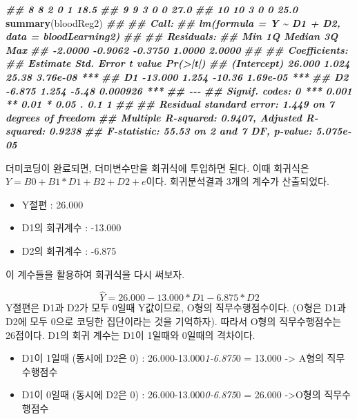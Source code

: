 \documentclass[
]{book}
\newenvironment{Shaded}{\begin{snugshade}}{\end{snugshade}}
\newcommand{\DocumentationTok}[1]{\textcolor[rgb]{0.56,0.35,0.01}{\textbf{\textit{#1}}}}
\newcommand{\FunctionTok}[1]{\textcolor[rgb]{0.13,0.29,0.53}{\textbf{#1}}}
\newcommand{\NormalTok}[1]{#1}
\providecommand{\tightlist}{%
  \setlength{\itemsep}{0pt}\setlength{\parskip}{0pt}}
\begin{document}
\begin{Shaded}
\begin{Highlighting}[]
\DocumentationTok{\#\# 8   8 2  0  1 18.5}
\DocumentationTok{\#\# 9   9 3  0  0 27.0}
\DocumentationTok{\#\# 10 10 3  0  0 25.0}
\FunctionTok{summary}\NormalTok{(bloodReg2)}
\DocumentationTok{\#\# }
\DocumentationTok{\#\# Call:}
\DocumentationTok{\#\# lm(formula = Y \textasciitilde{} D1 + D2, data = bloodLearning2)}
\DocumentationTok{\#\# }
\DocumentationTok{\#\# Residuals:}
\DocumentationTok{\#\#     Min      1Q  Median      3Q     Max }
\DocumentationTok{\#\# {-}2.0000 {-}0.9062 {-}0.3750  1.0000  2.0000 }
\DocumentationTok{\#\# }
\DocumentationTok{\#\# Coefficients:}
\DocumentationTok{\#\#             Estimate Std. Error t value Pr(\textgreater{}|t|)    }
\DocumentationTok{\#\# (Intercept)   26.000      1.024   25.38 3.76e{-}08 ***}
\DocumentationTok{\#\# D1           {-}13.000      1.254  {-}10.36 1.69e{-}05 ***}
\DocumentationTok{\#\# D2            {-}6.875      1.254   {-}5.48 0.000926 ***}
\DocumentationTok{\#\# {-}{-}{-}}
\DocumentationTok{\#\# Signif. codes:  0 \textquotesingle{}***\textquotesingle{} 0.001 \textquotesingle{}**\textquotesingle{} 0.01 \textquotesingle{}*\textquotesingle{} 0.05 \textquotesingle{}.\textquotesingle{} 0.1 \textquotesingle{} \textquotesingle{} 1}
\DocumentationTok{\#\# }
\DocumentationTok{\#\# Residual standard error: 1.449 on 7 degrees of freedom}
\DocumentationTok{\#\# Multiple R{-}squared:  0.9407, Adjusted R{-}squared:  0.9238 }
\DocumentationTok{\#\# F{-}statistic: 55.53 on 2 and 7 DF,  p{-}value: 5.075e{-}05}
\end{Highlighting}
\end{Shaded}

더미코딩이 완료되면, 더미변수만을 회귀식에 투입하면 된다. 이때 회귀식은 \(Y=B0+B1*D1+B2+D2+e\)이다. 회귀분석결과 3개의 계수가 산출되었다.

\begin{itemize}
\tightlist
\item
  Y절편 : 26.000
\item
  D1의 회귀계수 : -13.000
\item
  D2의 회귀계수 : -6.875
\end{itemize}

이 계수들을 활용하여 회귀식을 다시 써보자.

\[ \hat{Y}= 26.000-13.000\ast D1 -6.875\ast D2 \]
Y절편은 D1과 D2가 모두 0일때 Y값이므로, O형의 직무수행점수이다. (O형은 D1과 D2에 모두 0으로 코딩한 집단이라는 것을 기억하자). 따라서 O형의 직무수행점수는 26점이다.
D1의 회귀 계수는 D1이 1일때와 0일때의 격차이다.

\begin{itemize}
\tightlist
\item
  D1이 1일때 (동시에 D2은 0) : 26.000-13.000\emph{1-6.875}0 = 13.000 -\textgreater{} A형의 직무수행점수
\item
  D1이 0일때 (동시에 D2은 0) : 26.000-13.000\emph{0-6.875}0 = 26.000 -\textgreater O형의 직무수행점수
\end{itemize}
\end{document}
